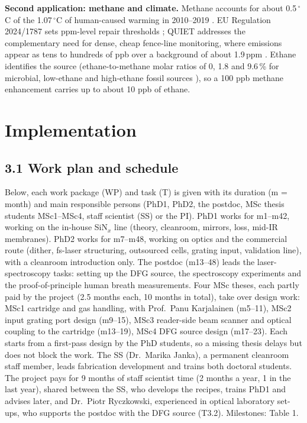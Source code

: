 \documentclass[a4paper,12pt]{article}
\newcommand{\nc}[1]{\textcolor{dkleaf}{#1}} %
\begin{document}
\textbf{Second application: methane and climate.} Methane accounts for about 0.5\,$^\circ$C of the 1.07\,$^\circ$C of human-caused warming in 2010--2019 \cite{IPCC2021}. EU Regulation 2024/1787 sets ppm-level repair thresholds \cite{EUMethane2024}; QUIET addresses the complementary need for dense, cheap fence-line monitoring, where emissions appear as tens to hundreds of ppb over a background of about 1.9\,ppm \cite{Saunois2025}. Ethane identifies the source (ethane-to-methane molar ratios of 0, 1.8 and 9.6\,\% for microbial, low-ethane and high-ethane fossil sources \cite{Smith2015}), so a 100 ppb methane enhancement carries up to about 10 ppb of ethane.


\section{Implementation}

\subsection*{3.1 Work plan and schedule}
Below, each work package (WP) and task (T) is given with its duration (m = month) and main responsible persons (PhD1, PhD2, the postdoc, MSc thesis students MSc1--MSc4, staff scientist (SS) or the PI). PhD1 works for m1--m42, working on the in-house SiN$_x$ line (theory, cleanroom, mirrors, loss, mid-IR membranes). PhD2 works for \nc{m7--m48}, working on optics and the commercial route (dither, fs-laser structuring, outsourced cells, grating input, validation line), with a cleanroom introduction only. The postdoc  (m13--48) leads the laser-spectroscopy tasks: setting up the DFG source, the spectroscopy experiments and the proof-of-principle human breath measurements. \nc{Four} MSc theses, each partly paid by the project (2.5 months each, \nc{10} months in total), take over design work: \nc{MSc1 cartridge and gas handling, with Prof.~Panu Karjalainen (m5--11),} MSc2 \nc{input grating port design (m9--15), MSc3 reader-side beam scanner and optical coupling to the cartridge (m13--19)}, MSc4 DFG source design (m17--23). \nc{Each starts from a first-pass design by the PhD students, so a missing thesis delays but does not block the work.} %
The SS (Dr.~Marika Janka), a permanent cleanroom staff member, leads fabrication development and trains both doctoral students. The project pays for 9 months of staff scientist time (2 months a year, 1 in the last year), shared between the SS, who develops the recipes, trains PhD1 and advises later, and Dr.~Piotr Ryczkowski, experienced in optical laboratory set-ups, who supports the postdoc with the DFG source (T3.2). Milestones: Table 1.
\end{document}
